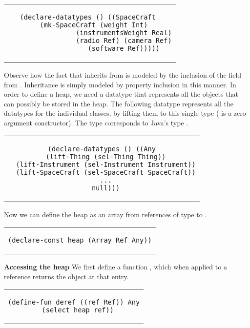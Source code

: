 \begin{center}
\begin{tabular}{c}
\begin{lstlisting}  
(declare-datatypes () ((SpaceCraft 
  (mk-SpaceCraft (weight Int)
                 (instrumentsWeight Real)
                 (radio Ref) (camera Ref)
                 (software Ref)))))
\end{lstlisting}
\end{tabular}
\end{center}

\noindent Observe how the fact that  inherits from
 is modeled by the inclusion of the  field
from . Inheritance is simply modeled by property
inclusion in this manner.  In order to define a heap, we need a
datatype that represents all the objects that can possibly be stored
in the heap. The following datatype  represents all the
datatypes for the individual classes, by lifting them to this single
type ( is a zero argument constructor). The type 
corresponds to Java's type .

\begin{center}
\begin{tabular}{c}
\begin{lstlisting}
(declare-datatypes () ((Any
  (lift-Thing (sel-Thing Thing))
  (lift-Instrument (sel-Instrument Instrument))
  (lift-SpaceCraft (sel-SpaceCraft SpaceCraft))
  ...
  null)))
\end{lstlisting}
\end{tabular}
\end{center}

\noindent Now we can define the heap as an array from references of
type  to .

\begin{center}
\begin{tabular}{c}
\begin{lstlisting}
(declare-const heap (Array Ref Any))
\end{lstlisting}
\end{tabular}
\end{center}

\textbf{Accessing the heap} We first define a function ,
which when applied to a reference returns the  object at
that entry.

\begin{center}
\begin{tabular}{c}
\begin{lstlisting}
(define-fun deref ((ref Ref)) Any
  (select heap ref))
\end{lstlisting}
\end{tabular}
\end{center}

